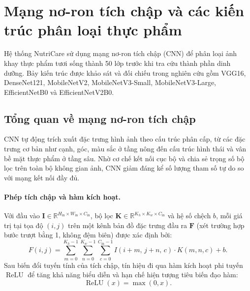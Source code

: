 \section{Mạng nơ-ron tích chập và các kiến trúc phân loại thực phẩm}
\label{sec:cnn-food-classification}

Hệ thống NutriCare sử dụng mạng nơ-ron tích chập (CNN) để phân loại ảnh khay thực phẩm tươi sống thành 50 lớp trước khi tra cứu thành phần dinh dưỡng. Bảy kiến trúc được khảo sát và đối chiếu trong nghiên cứu gồm VGG16, DenseNet121, MobileNetV2, MobileNetV3-Small, MobileNetV3-Large, EfficientNetB0 và EfficientNetV2B0.

\subsection{Tổng quan về mạng nơ-ron tích chập}
\label{subsec:cnn-overview}

CNN tự động trích xuất đặc trưng hình ảnh theo cấu trúc phân cấp, từ các đặc trưng cơ bản như cạnh, góc, màu sắc ở tầng nông đến cấu trúc hình thái và vân bề mặt thực phẩm ở tầng sâu. Nhờ cơ chế kết nối cục bộ và chia sẻ trọng số bộ lọc trên toàn bộ không gian ảnh, CNN giảm đáng kể số lượng tham số tự do so với mạng kết nối đầy đủ.

\paragraph{Phép tích chập và hàm kích hoạt.}
Với đầu vào $\mathbf{I} \in \mathbb{R}^{H_{\mathrm{in}} \times W_{\mathrm{in}} \times C_{\mathrm{in}}}$, bộ lọc $\mathbf{K} \in \mathbb{R}^{K_h \times K_w \times C_{\mathrm{in}}}$ và hệ số chệch $b$, mỗi giá trị tại tọa độ $(i, j)$ trên một kênh bản đồ đặc trưng đầu ra $\mathbf{F}$ (xét trường hợp bước trượt bằng 1, không đệm biên) được xác định bởi:
\begin{equation}
    F(i, j) = \sum_{m=0}^{K_h-1} \sum_{n=0}^{K_w-1} \sum_{c=0}^{C_{\mathrm{in}}-1} I(i+m,\, j+n,\, c) \cdot K(m, n, c) + b.
    \label{eq:cnn-conv}
\end{equation}
Sau biến đổi tuyến tính của tích chập, tín hiệu đi qua hàm kích hoạt phi tuyến $\operatorname{ReLU}$ để tăng khả năng biểu diễn và hạn chế hiện tượng tiêu biến đạo hàm:
\begin{equation}
    \operatorname{ReLU}(x) = \max(0, x).
    \label{eq:relu}
\end{equation}


